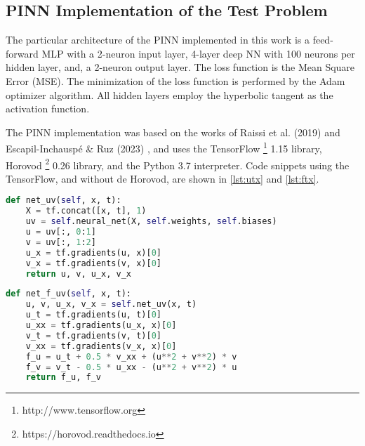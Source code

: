 \documentclass[conference]{IEEEtran}
\begin{document}
\subsection{PINN Implementation of the Test Problem}

The particular architecture of the PINN implemented in this work is a feed-forward MLP with a 2-neuron input layer, 4-layer deep NN with 100 neurons per hidden layer, and, a 2-neuron output layer. The loss function is the Mean Square Error (MSE). The minimization of the loss function is performed by the Adam optimizer algorithm. All hidden layers employ the hyperbolic tangent as the activation function.

The PINN implementation was based on the works of Raissi et al. (2019) \cite{Raissi2019} and Escapil-Inchauspé \& Ruz  (2023) \cite{Escapil}, and uses the TensorFlow%
\footnote{http://www.tensorflow.org}
1.15 library, Horovod%
\footnote{https://horovod.readthedocs.io}
0.26 library, and the Python 3.7 interpreter. Code snippets using the TensorFlow, and without de Horovod, are shown in \autoref {lst:utx} and \autoref {lst:ftx}. 

\begin{lstlisting}[language=Python, label=lst:utx, caption={Code snippet that implements $h(t,x)$}]
def net_uv(self, x, t):
    X = tf.concat([x, t], 1)
    uv = self.neural_net(X, self.weights, self.biases)
    u = uv[:, 0:1]
    v = uv[:, 1:2]
    u_x = tf.gradients(u, x)[0]
    v_x = tf.gradients(v, x)[0]
    return u, v, u_x, v_x
\end{lstlisting}

\begin{lstlisting}[language=Python, label=lst:ftx, caption={Code snippet that implements $f(t,x)$}]
def net_f_uv(self, x, t):
    u, v, u_x, v_x = self.net_uv(x, t)
    u_t = tf.gradients(u, t)[0]
    u_xx = tf.gradients(u_x, x)[0]
    v_t = tf.gradients(v, t)[0]
    v_xx = tf.gradients(v_x, x)[0]
    f_u = u_t + 0.5 * v_xx + (u**2 + v**2) * v
    f_v = v_t - 0.5 * u_xx - (u**2 + v**2) * u
    return f_u, f_v
\end{lstlisting}
\end{document}
